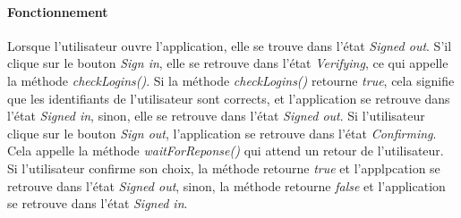 \paragraph{Fonctionnement} Lorsque l'utilisateur ouvre l'application, elle se trouve dans l'état \emph{Signed out}. S'il clique sur le bouton \emph{Sign in}, elle se retrouve dans l'état \emph{Verifying}, ce qui appelle la méthode \emph{checkLogins()}. Si la méthode \emph{checkLogins()} retourne \emph{true}, cela signifie que les identifiants de l'utilisateur sont corrects, et l'application se retrouve dans l'état \emph{Signed in}, sinon, elle se retrouve dans l'état \emph{Signed out}. Si l'utilisateur clique sur le bouton \emph{Sign out}, l'application se retrouve dans l'état \emph{Confirming}. Cela appelle la méthode \emph{waitForReponse()} qui attend un retour de l'utilisateur. Si l'utilisateur confirme son choix, la méthode retourne \emph{true} et l'applpcation se retrouve dans l'état \emph{Signed out}, sinon, la méthode retourne \emph{false} et l'application se retrouve dans l'état \emph{Signed in}.